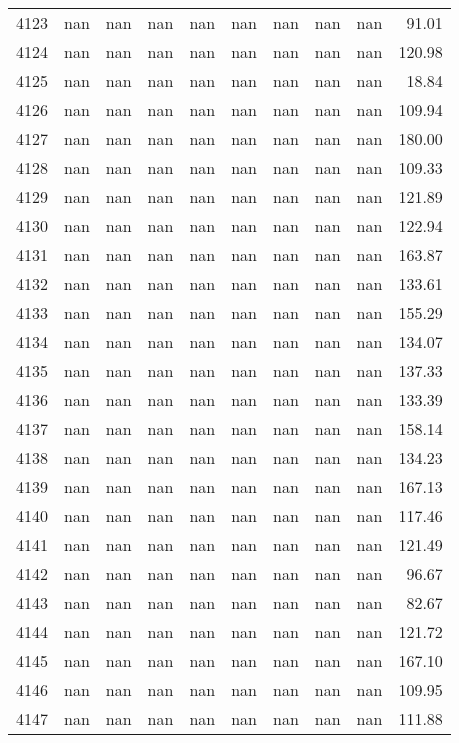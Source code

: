 \begin{tabular}{lrrrrrrrrr}
4123 & nan & nan & nan & nan & nan & nan & nan & nan & 91.01 \\
4124 & nan & nan & nan & nan & nan & nan & nan & nan & 120.98 \\
4125 & nan & nan & nan & nan & nan & nan & nan & nan & 18.84 \\
4126 & nan & nan & nan & nan & nan & nan & nan & nan & 109.94 \\
4127 & nan & nan & nan & nan & nan & nan & nan & nan & 180.00 \\
4128 & nan & nan & nan & nan & nan & nan & nan & nan & 109.33 \\
4129 & nan & nan & nan & nan & nan & nan & nan & nan & 121.89 \\
4130 & nan & nan & nan & nan & nan & nan & nan & nan & 122.94 \\
4131 & nan & nan & nan & nan & nan & nan & nan & nan & 163.87 \\
4132 & nan & nan & nan & nan & nan & nan & nan & nan & 133.61 \\
4133 & nan & nan & nan & nan & nan & nan & nan & nan & 155.29 \\
4134 & nan & nan & nan & nan & nan & nan & nan & nan & 134.07 \\
4135 & nan & nan & nan & nan & nan & nan & nan & nan & 137.33 \\
4136 & nan & nan & nan & nan & nan & nan & nan & nan & 133.39 \\
4137 & nan & nan & nan & nan & nan & nan & nan & nan & 158.14 \\
4138 & nan & nan & nan & nan & nan & nan & nan & nan & 134.23 \\
4139 & nan & nan & nan & nan & nan & nan & nan & nan & 167.13 \\
4140 & nan & nan & nan & nan & nan & nan & nan & nan & 117.46 \\
4141 & nan & nan & nan & nan & nan & nan & nan & nan & 121.49 \\
4142 & nan & nan & nan & nan & nan & nan & nan & nan & 96.67 \\
4143 & nan & nan & nan & nan & nan & nan & nan & nan & 82.67 \\
4144 & nan & nan & nan & nan & nan & nan & nan & nan & 121.72 \\
4145 & nan & nan & nan & nan & nan & nan & nan & nan & 167.10 \\
4146 & nan & nan & nan & nan & nan & nan & nan & nan & 109.95 \\
4147 & nan & nan & nan & nan & nan & nan & nan & nan & 111.88 \\

\end{tabular}
